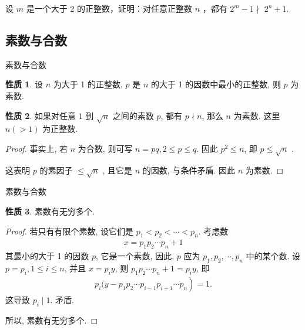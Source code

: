 \documentclass[aspectratio=169]{ctexbeamer}
\theoremstyle{definition}
\newtheorem{property}{性质}[section]
\begin{document}
\begin{frame}[t]
	\begin{example}
		设 $m$ 是一个大于 2 的正整数，证明：对任意正整数 $n$ ，都有 $2^{m}-1 \nmid$ $2^{n}+1$.
	\end{example}
\end{frame}

\subsection{素数与合数}\setcounter{theorem}{0}
\begin{frame}{素数与合数}
	\begin{property}
		设 $n$ 为大于 1 的正整数, $p$ 是 $n$ 的大于 1 的因数中最小的正整数, 则 $p$ 为素数.
	\end{property}
	\pause
	\begin{property}
		如果对任意 $1$ 到 $\sqrt{n}$ 之间的素数 $p$, 都有 $p \nmid n$, 那么 $n$ 为素数. 这里 $n(>1)$ 为正整数.
	\end{property}
	\pause
	\begin{proof}
		事实上, 若 $n$ 为合数, 则可写 $n=p q, 2 \leqslant p \leqslant q$. 因此 $p^{2} \leqslant n$, 即 $p \leqslant \sqrt{n}$ .

		这表明 $p$ 的素因子 $\leqslant \sqrt{n}$ , 且它是 $n$ 的因数, 与条件矛盾. 因此 $n$ 为素数.
	\end{proof}
\end{frame}

\begin{frame}{素数与合数}
	\begin{property}
		素数有无穷多个.
	\end{property}
	\pause
	\begin{proof}
		若只有有限个素数, 设它们是 $p_{1}<p_{2}<\cdots<p_{n}$. 考虑数
		\begin{align*}
			x=p_{1} p_{2} \cdots p_{n}+1
		\end{align*}
		其最小的大于 1 的因数 $p$, 它是一个素数, 因此, $p$ 应为 $p_{1}, p_{2}, \cdots, p_{n}$ 中的某个数. 设 $p=p_{i}, 1 \leqslant i \leqslant n$, 并且 $x=p_{i} y$, 则 $p_{1} p_{2} \cdots p_{n}+1=p_{i} y$, 即
		\begin{align*}
			p_{i}(y-\left.p_{1} p_{2} \cdots p_{i-1} p_{i+1} \cdots p_{n}\right)=1.
		\end{align*}
		这导致 $p_{i} \mid 1$. 矛盾.

		所以, 素数有无穷多个.
	\end{proof}
\end{frame}
\end{document}
